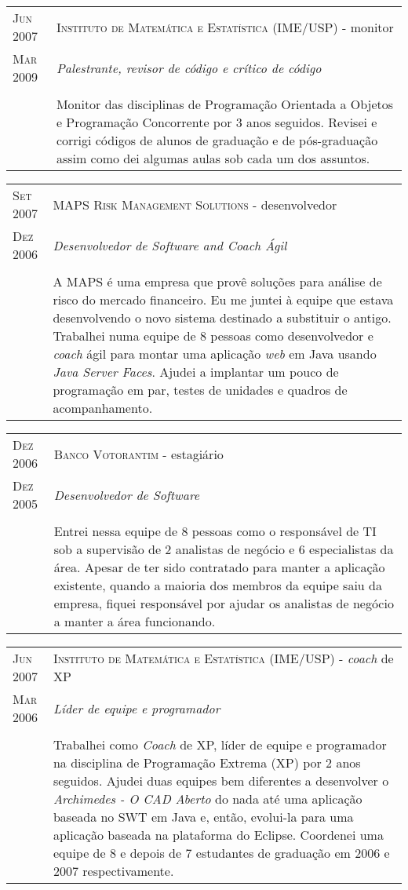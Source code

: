 \documentclass[letter,10pt]{article}
\begin{document}
\begin{tabular}{p{2.5cm}|p{13.5cm}}
  \textsc{Jun 2007} & \textsc{Instituto de Matemática e Estatística
    (IME/USP)} - monitor\\
  \textsc{Mar 2009}& \emph{Palestrante, revisor de código e crítico
    de código}\\
  &\\
  &Monitor das disciplinas de Programação Orientada a Objetos e
  Programação Concorrente por 3 anos seguidos. Revisei e corrigi
  códigos de alunos de graduação e de pós-graduação assim como dei
  algumas aulas sob cada um dos assuntos.
\end{tabular}


\begin{tabular}{p{2.5cm}|p{13.5cm}}
  \textsc{Set 2007} & \textsc{MAPS Risk
    Management Solutions} - desenvolvedor\\
  \textsc{Dez 2006} &\emph{Desenvolvedor de Software and Coach Ágil}\\
  &\\
  & A MAPS é uma empresa que provê soluções para análise de risco do
  mercado financeiro. Eu me juntei à equipe que estava desenvolvendo o
  novo sistema destinado a substituir o antigo. Trabalhei numa equipe
  de 8 pessoas como desenvolvedor e \textit{coach} ágil para montar
  uma aplicação \textit{web} em Java usando \textit{Java Server
    Faces}. Ajudei a implantar um pouco de programação em par, testes
  de unidades e quadros de acompanhamento.
\end{tabular}

\begin{tabular}{p{2.5cm}|p{13.5cm}}
  \textsc{Dez 2006} & \textsc{Banco Votorantim} - estagiário\\
  \textsc{Dez 2005} &\emph{Desenvolvedor de Software}\\
  &\\
  &Entrei nessa equipe de 8 pessoas como o responsável de TI sob a
  supervisão de 2 analistas de negócio e 6 especialistas da área. Apesar de
  ter sido contratado para manter a aplicação existente, quando a
  maioria dos membros da equipe saiu da empresa, fiquei responsável
  por ajudar os analistas de negócio a manter a área funcionando.
\end{tabular}

\begin{tabular}{p{2.5cm}|p{13.5cm}}
  \textsc{Jun 2007} & \textsc{Instituto de Matemática e Estatística
    (IME/USP)} - \textit{coach} de XP\\
  \textsc{Mar 2006}& \emph{Líder de equipe e programador}\\
  &\\
  &  Trabalhei como \textit{Coach} de XP, líder de equipe e
  programador na disciplina de Programação Extrema (XP) por 2 anos
  seguidos. Ajudei duas equipes bem diferentes a desenvolver o
  \emph{Archimedes - O CAD Aberto}  do nada até uma aplicação baseada
  no SWT em Java e, então, evolui-la para uma aplicação baseada na
  plataforma do Eclipse. Coordenei uma equipe de 8 e depois de 7
  estudantes de graduação em 2006 e 2007 respectivamente.
\end{tabular}
\end{document}
